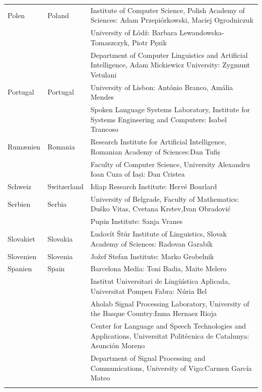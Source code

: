 \begin{longtable}{llp{105mm}}
  Polen & \textcolor{grey1}{Poland} & Institute of Computer Science, Polish Academy of Sciences: Adam Przepiórkowski, Maciej Ogrodniczuk \\ \addlinespace
  & & University of Łódź: Barbara Lewandowska-Tomaszczyk, Piotr Pęzik\\ \addlinespace
  & & Department of Computer Linguistics and Artificial Intelligence, Adam Mickiewicz University: Zygmunt Vetulani \\ \addlinespace
  
  Portugal & \textcolor{grey1}{Portugal} & University of Lisbon: António Branco, Amália Mendes \\ \addlinespace
  & & Spoken Language Systems Laboratory, Institute for Systems Engineering and Computers: Isabel Trancoso \\ \addlinespace
  
  Rum\ae nien & \textcolor{grey1}{Romania} & Research Institute for Artificial Intelligence, Romanian Academy of Sciences:\newline Dan Tufiș \\ \addlinespace
  & & Faculty of Computer Science, University Alexandru Ioan Cuza of Iași: Dan Cristea \\ \addlinespace
  
  Schweiz & \textcolor{grey1}{Switzerland} & Idiap Research Institute: Hervé Bourlard \\ \addlinespace 
  
  Serbien & \textcolor{grey1}{Serbia} & University of Belgrade, Faculty of Mathematics: Duško Vitas, Cvetana Krstev,\newline Ivan Obradović \\ \addlinespace
  & & Pupin Institute: Sanja Vranes \\ \addlinespace  
  
  Slovakiet & \textcolor{grey1}{Slovakia} & Ľudovít Štúr Institute of Linguistics, Slovak Academy of Sciences: Radovan Garabík \\ \addlinespace  
  
  Slovenien & \textcolor{grey1}{Slovenia} & Jožef Stefan Institute: Marko Grobelnik \\ \addlinespace  
  
  Spanien & \textcolor{grey1}{Spain} & Barcelona Media: Toni Badia, Maite Melero \\ \addlinespace 
  & & Institut Universitari de Lingüística Aplicada, Universitat Pompeu Fabra: Núria Bel \\ \addlinespace 
  & & Aholab Signal Processing Laboratory, University of the Basque Country:\newline Inma Hernaez Rioja \\ \addlinespace 
  & & Center for Language and Speech Technologies and Applications, Universitat Politècnica de Catalunya:  Asunción Moreno \\ \addlinespace 
  & & Department of Signal Processing and Communications, University of Vigo:\newline Carmen García Mateo \\ \addlinespace
  

\end{longtable}

